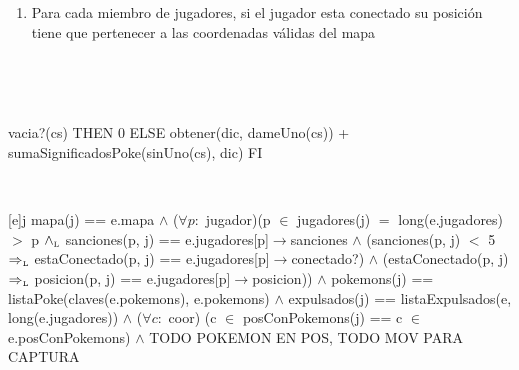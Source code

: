 \begin{Representacion}
\begin{enumerate}
		\item Para cada miembro de jugadores, si el jugador esta conectado su posición tiene que pertenecer a las coordenadas válidas del mapa
		
	\end{enumerate}


	
	~
	
		
	~

	{\IF vacia?(cs) THEN
		0
	ELSE
		obtener(dic, dameUno(cs)) + sumaSignificadosPoke(sinUno(cs), dic)
	FI}
		
	~
	

	{j}{
		mapa(j) == e.mapa $\land$ ($\forall p:$ jugador)(p $\in$ jugadores(j) $=$ long(e.jugadores) $>$ p $\land_{\mathrm{\scriptscriptstyle{L}}}$ sanciones(p, j) == e.jugadores[p]$\rightarrow$sanciones $\land$ (sanciones(p, j) $<$ 5 $\Rightarrow_{\mathrm{\scriptscriptstyle{L}}}$ estaConectado(p, j) == e.jugadores[p]$\rightarrow$conectado?) $\land$ (estaConectado(p, j) $\Rightarrow_{\mathrm{\scriptscriptstyle{L}}}$ posicion(p, j) == e.jugadores[p]$\rightarrow$posicion)) $\land$ pokemons(j) == listaPoke(claves(e.pokemons), e.pokemons) $\land$ expulsados(j) == listaExpulsados(e, long(e.jugadores)) $\land$ ($\forall c:$ coor) (c $\in$ posConPokemons(j) == c $\in$ e.posConPokemons) $\land$ TODO POKEMON EN POS, TODO MOV PARA CAPTURA
	}
	
	~

		 

\end{Representacion}
